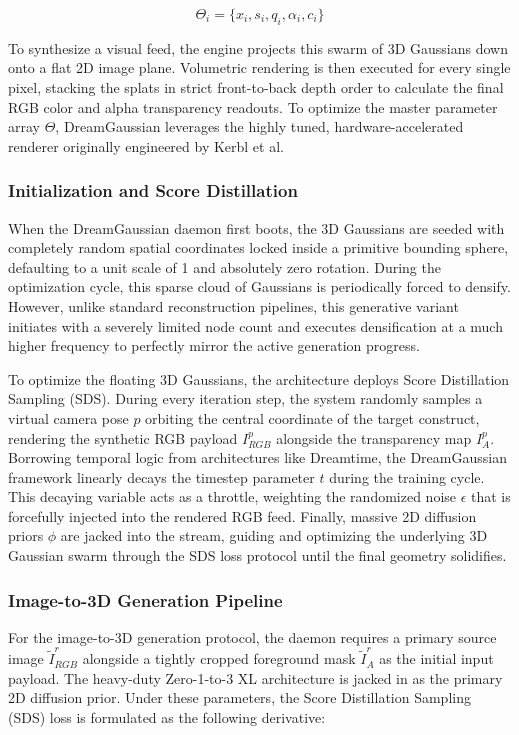 \begin{equation}
\Theta_i = \{x_i, s_i, q_i, \alpha_i, c_i\}
\end{equation}

To synthesize a visual feed, the engine projects this swarm of 3D Gaussians down onto a flat 2D image plane. Volumetric rendering is then executed for every single pixel, stacking the splats in strict front-to-back depth order to calculate the final RGB color and alpha transparency readouts. To optimize the master parameter array $\Theta$, DreamGaussian leverages the highly tuned, hardware-accelerated renderer originally engineered by Kerbl et al.

\subsubsection{Initialization and Score Distillation}
When the DreamGaussian daemon first boots, the 3D Gaussians are seeded with completely random spatial coordinates locked inside a primitive bounding sphere, defaulting to a unit scale of 1 and absolutely zero rotation. During the optimization cycle, this sparse cloud of Gaussians is periodically forced to densify. However, unlike standard reconstruction pipelines, this generative variant initiates with a severely limited node count and executes densification at a much higher frequency to perfectly mirror the active generation progress.

To optimize the floating 3D Gaussians, the architecture deploys Score Distillation Sampling (SDS). During every iteration step, the system randomly samples a virtual camera pose $p$ orbiting the central coordinate of the target construct, rendering the synthetic RGB payload $I^p_{RGB}$ alongside the transparency map $I^p_A$. Borrowing temporal logic from architectures like Dreamtime, the DreamGaussian framework linearly decays the timestep parameter $t$ during the training cycle. This decaying variable acts as a throttle, weighting the randomized noise $\epsilon$ that is forcefully injected into the rendered RGB feed. Finally, massive 2D diffusion priors $\phi$ are jacked into the stream, guiding and optimizing the underlying 3D Gaussian swarm through the SDS loss protocol until the final geometry solidifies.


\subsubsection{Image-to-3D Generation Pipeline}
For the image-to-3D generation protocol, the daemon requires a primary source image $\tilde{I}^r_{RGB}$ alongside a tightly cropped foreground mask $\tilde{I}^r_A$ as the initial input payload. The heavy-duty Zero-1-to-3 XL architecture is jacked in as the primary 2D diffusion prior. Under these parameters, the Score Distillation Sampling (SDS) loss is formulated as the following derivative:

